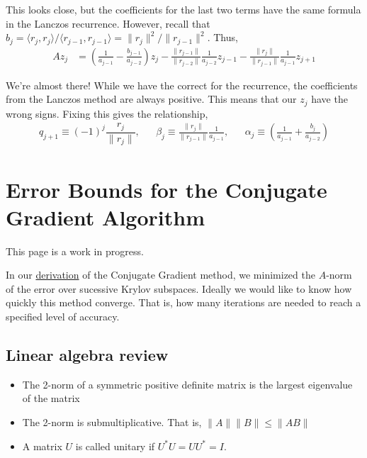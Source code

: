 This looks close, but the coefficients for the last two terms have the
same formula in the Lanczos recurrence. However, recall that
\(b_{j} = \langle r_j,r_j \rangle / \langle r_{j-1},r_{j-1} \rangle = \|r_j\|^2 / \|r_{j-1}\|^2\).
Thus, \begin{align*}
    Az_{j} &= \left(\frac{1}{a_{j-1}}-\frac{b_{j-1}}{a_{j-2}}\right) z_{j} 
    - \frac{\|r_{j-1}\|}{\|r_{j-2}\|}\frac{1}{a_{j-2}} z_{j-1} - \frac{\|r_j\|}{\|r_{j-1}\|} \frac{1}{a_{j-1}} z_{j+1}
\end{align*}

We're almost there! While we have the correct for the recurrence, the
coefficients from the Lanczos method are always positive. This means
that our \(z_{j}\) have the wrong signs. Fixing this gives the
relationship, \begin{align*}
q_{j+1} \equiv (-1)^j\dfrac{r_j}{\|r_j\|}
,&&
\beta_j \equiv \frac{\|r_j\|}{\|r_{j-1}\|}\frac{1}{a_{j-1}}
,&&
\alpha_j \equiv \left(\frac{1}{a_{j-1}} + \frac{b_{j}}{a_{j-2}}\right)
\end{align*}

\hypertarget{error-bounds-for-the-conjugate-gradient-algorithm}{%
\section{Error Bounds for the Conjugate Gradient
Algorithm}\label{error-bounds-for-the-conjugate-gradient-algorithm}}

This page is a work in progress.

In our \href{./cg_derivation.html}{derivation} of the Conjugate Gradient
method, we minimized the \(A\)-norm of the error over sucessive Krylov
subspaces. Ideally we would like to know how quickly this method
converge. That is, how many iterations are needed to reach a specified
level of accuracy.

\hypertarget{linear-algebra-review-1}{%
\subsection{Linear algebra review}\label{linear-algebra-review-1}}

\begin{itemize}
\tightlist
\item
  The 2-norm of a symmetric positive definite matrix is the largest
  eigenvalue of the matrix
\item
  The 2-norm is submultiplicative. That is, \(\|A\|\|B\|\leq \|AB\|\)
\item
  A matrix \(U\) is called unitary if \(U^*U = UU^* = I\).
\end{itemize}

